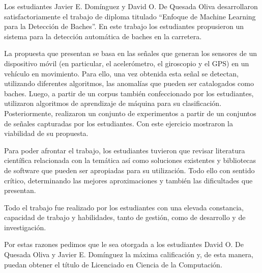 \begin{opinion}
    Los estudiantes Javier E. Domínguez y David O. De Quesada Oliva desarrollaron satisfactoriamente el trabajo de diploma titulado 
    “Enfoque de Machine Learning para la Detección de Baches”. En este trabajo los estudiantes propusieron un sistema para 
    la detección automática de baches en la carretera.

    La propuesta que presentan se basa en las señales que generan los sensores de un dispositivo móvil (en particular, el acelerómetro, 
    el giroscopio y el GPS) en un vehículo en movimiento. Para ello, una vez obtenida esta señal se detectan, utilizando diferentes algoritmos, 
    las anomalías que pueden ser catalogados como baches. Luego, a partir de un corpus también confeccionado por los estudiantes, 
    utilizaron algoritmos de aprendizaje de máquina para su clasificación. Posteriormente, realizaron un conjunto de experimentos a 
    partir de un conjuntos de señales capturadas por los estudiantes. Con este ejercicio mostraron la viabilidad de su propuesta.


    Para poder afrontar el trabajo, los estudiantes tuvieron que revisar literatura científica relacionada con la temática así como soluciones 
    existentes y bibliotecas de software que pueden ser apropiadas para su utilización. Todo ello con sentido crítico, determinando 
    las mejores aproximaciones y también las dificultades que presentan.

    Todo el trabajo fue realizado por los estudiantes con una elevada constancia, capacidad de trabajo y habilidades, tanto de gestión, como 
    de desarrollo y de investigación. 

    Por estas razones pedimos que le sea otorgada a los estudiantes David O. De Quesada Oliva y Javier E. Domínguez la máxima calificación y, 
    de esta manera,  puedan obtener el título de Licenciado en Ciencia de la Computación.
\end{opinion}
